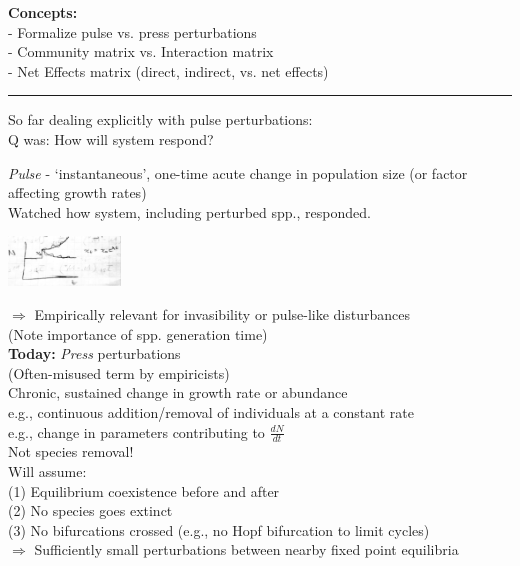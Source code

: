 \documentclass{article}
\newcommand{\ind}{\-\hspace{1cm}}
\begin{document}
\noindent{}

\textbf{Concepts:}\\
\ind - Formalize pulse vs. press perturbations\\
\ind - Community matrix vs. Interaction matrix\\
\ind - Net Effects matrix (direct, indirect, vs. net effects)

\rule[0.5ex]{\linewidth}{1pt}
So far dealing explicitly with pulse perturbations:\\
\ind Q was: How will system respond?

\ind \emph{Pulse} - `instantaneous', one-time acute change in population size (or factor affecting growth rates)\\
\ind\ind Watched how system, including perturbed spp., responded.
\begin{center}
 	\includegraphics[width=3cm]{figs/Pulse.pdf}
\end{center}
\ind \ind $\Rightarrow$ Empirically relevant for invasibility or pulse-like disturbances\\
\ind \ind \ind (Note importance of spp. generation time)\\

\textbf{Today:}  \emph{Press} perturbations\\
\ind (Often-misused term by empiricists)\\
\ind \ind Chronic, sustained change in growth rate or abundance\\
\ind \ind \ind e.g., continuous addition/removal of individuals at a constant rate\\
\ind \ind \ind e.g., change in parameters contributing to $\frac{dN}{dt}$\\
\ind \ind Not species removal!\\

\ind Will assume: \\
\ind \ind (1) Equilibrium coexistence before and after\\
\ind \ind (2) No species goes extinct\\
\ind \ind (3) No bifurcations crossed (e.g., no Hopf bifurcation to limit cycles)\\
\ind  \ind $\Rightarrow$ Sufficiently small perturbations between nearby fixed point equilibria
\end{document}
